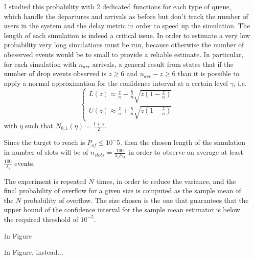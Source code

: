 \documentclass[10pt]{article}
\begin{document}
I studied this probability with 2 dedicated functions for each type of queue, which handle the departures and arrivals as before but don't track the number of users in the system and the delay metric in order to speed up the simulation. The length of each simulation is indeed a critical issue. In order to estimate a very low probability very long simulations must be run, because otherwise the number of obeserved events would be to small to provide a reliable estimate. In particular, for each simulation with $n_{arr}$ arrivals, a general result from \cite{leb} states that if the number of drop events observed is $z \ge 6$ and $n_{arr} - z \ge 6$ than it is possible to apply a normal approximation for the confidence interval at a certain level $\gamma$, i.e.
\begin{equation}
  \begin{cases}
  L(z) \approx \frac{z}{n} - \frac{\eta}{n}\sqrt{z\left(1 - \frac{z}{n}\right)} \\
  U(z) \approx \frac{z}{n} + \frac{\eta}{n}\sqrt{z\left(1 - \frac{z}{n}\right)}
  \end{cases}
\end{equation}
with $\eta$ such that $N_{0,1}(\eta) = \frac{1+\gamma}{2}$.

Since the target to reach is $P_{of} \le 10^-5$, then the chosen length of the simulation in number of slots will be of $n_{slots} = \frac{100}{\lambda_i P_{of}}$ in order to observe on average at least $\frac{100}{\lambda_i}$ events. 

The experiment is repeated $N$ times, in order to reduce the variance, and the final probability of overflow for a given size is computed as the sample mean of the $N$ probability of overflow. The size chosen is the one that guarantees that the upper bound of the confidence interval for the sample mean estimator is below the required threshold of $10^{-5}$. 

In Figure 

In Figure, instead... 
\end{document}
